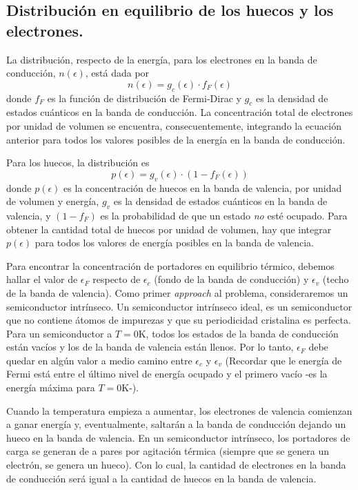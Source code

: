 \documentclass[12pt,a4paper]{article}
\begin{document}
\subsection{Distribución en equilibrio de los huecos y los electrones.}

La distribución, respecto de la energía, para los electrones en la banda de conducción, $n(\epsilon)$, está dada por
\[ n(\epsilon) = g_{c}(\epsilon) \cdot f_{F} (\epsilon) \]
donde $f_{F}$ es la función de distribución de Fermi-Dirac y $g_{c}$ es la densidad de estados cuánticos en la banda de conducción. La concentración total de electrones por unidad de volumen se encuentra, consecuentemente, integrando la ecuación anterior para todos los valores posibles de la energía en la banda de conducción.

Para los huecos, la distribución es
\[ p(\epsilon) = g_{v}(\epsilon) \cdot (1-f_{F} (\epsilon)) \]
donde $p(\epsilon)$ es la concentración de huecos en la banda de valencia, por unidad de volumen y energía, $g_{v}$ es la densidad de estados cuánticos en la banda de valencia, y $(1-f_{F})$ es la probabilidad de que un estado \emph{no} esté ocupado. Para obtener la cantidad total de huecos por unidad de volumen, hay que integrar $p(\epsilon)$ para todos los valores de energía posibles en la banda de valencia.

Para encontrar la concentración de portadores en equilibrio térmico, debemos hallar el valor de $\epsilon _{F}$ respecto de $\epsilon _{c}$ (fondo de la banda de conducción) y $\epsilon _{v}$ (techo de la banda de valencia). Como primer \emph{approach} al problema, consideraremos un semiconductor intrínseco. Un semiconductor intrínseco ideal, es un semiconductor que no contiene átomos de impurezas y que su periodicidad cristalina es perfecta. Para un semiconductor a $T=0$K, todos los estados de la banda de conducción están vacíos y los de la banda de valencia están llenos. Por lo tanto, $\epsilon _{F}$ debe quedar en algún valor a medio camino entre $\epsilon _{c}$ y $\epsilon _{v}$ (Recordar que le energía de Fermi está entre el último nivel de energía ocupado y el primero vacío -es la energía máxima para $T=0$K-).

Cuando la temperatura empieza a aumentar, los electrones de valencia comienzan a ganar energía y, eventualmente, saltarán a la banda de conducción dejando un hueco en la banda de valencia. En un semiconductor intrínseco, los portadores de carga se generan de a pares por agitación térmica (siempre que se genera un electrón, se genera un hueco). Con lo cual, la cantidad de electrones en la banda de conducción será igual a la cantidad de huecos en la banda de valencia.
\end{document}
